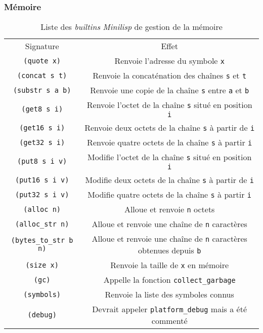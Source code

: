 \documentclass[c, 11pt, handout, xcolor=table]{beamer}
\newcommand{\codeC}[1]{\texttt{#1}}
\newcommand{\codeLisp}[1]{\texttt{#1}}
\newcommand{\foreign}[1]{\emph{#1}}
\begin{document}
\begin{frame}
 \frametitle{Mémoire}
 
 \begin{table}[H]
  \centering
  \begin{tabularx}{\linewidth}{|C|C|}
    \hline
    Signature & Effet \tabularnewline
    \hhline{|=|=|}
    \codeLisp{(quote x)} & Renvoie l'adresse du symbole \codeLisp{x} \tabularnewline
    \hline
    \codeLisp{(concat s t)} & Renvoie la concaténation des chaînes \codeLisp{s} et \codeLisp{t} \tabularnewline
    \hline
    \codeLisp{(substr s a b)} & Renvoie une copie de la chaîne \codeLisp{s} entre \codeLisp{a} et \codeLisp{b} \tabularnewline
    \hhline{|=|=|}
    \codeLisp{(get8 s i)} & Renvoie l'octet de la chaîne \codeLisp{s} situé en position \codeLisp{i} \tabularnewline
    \hline
    \codeLisp{(get16 s i)} & Renvoie deux octets de la chaîne \codeLisp{s} à partir de \codeLisp{i} \tabularnewline
    \hline
    \codeLisp{(get32 s i)} & Renvoie quatre octets de la chaîne \codeLisp{s} à partir \codeLisp{i} \tabularnewline
    \hline
    \codeLisp{(put8 s i v)} & Modifie l'octet de la chaîne \codeLisp{s} situé en position \codeLisp{i} \tabularnewline
    \hline
    \codeLisp{(put16 s i v)} & Modifie deux octets de la chaîne \codeLisp{s} à partir de \codeLisp{i} \tabularnewline
    \hline
    \codeLisp{(put32 s i v)} & Modifie quatre octets de la chaîne \codeLisp{s} à partir \codeLisp{i} \tabularnewline
    \hhline{|=|=|}
    \codeLisp{(alloc n)} & Alloue et renvoie \codeLisp{n} octets \tabularnewline
    \hline
    \codeLisp{(alloc_str n)} & Alloue et renvoie une chaîne de \codeLisp{n} caractères \tabularnewline
    \hline
    \codeLisp{(bytes_to_str b n)} & Alloue et renvoie une chaîne de \codeLisp{n} caractères obtenues depuis \codeLisp{b} \tabularnewline
    \hhline{|=|=|}
    \codeLisp{(size x)} & Renvoie la taille de \codeLisp{x} en mémoire \tabularnewline
    \hline
    \codeLisp{(gc)} & Appelle la fonction \codeC{collect_garbage} \tabularnewline
    \hline
    \codeLisp{(symbols)} & Renvoie la liste des symboles connus \tabularnewline
    \hline
    \codeLisp{(debug)} & Devrait appeler \codeC{platform_debug} mais a été commenté \tabularnewline
    \hline
  \end{tabularx}
  \caption{Liste des \foreign{builtins} \foreign{Minilisp} de gestion de la mémoire}
 \end{table}
\end{frame}
\end{document}
